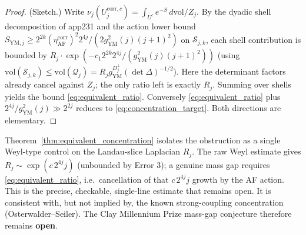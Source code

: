 \begin{proof}
(Sketch.) Write $\nu_{j}(U^{\mathrm{corr},c}_{j})=\int_{U^{c}}e^{-S}\,d\mathrm{vol}/Z_{j}$.
By the dyadic shell decomposition of app231 and the action lower bound
$S_{\mathrm{YM},j}\ge 2^{2k}(\eta_{\mathrm{AF}}^{\mathrm{corr}})^{2}2^{4j}/(2g_{\mathrm{YM}}^{2}(j)(j+1)^{2})$
on $\mathcal{S}_{j,k}$, each shell contribution is bounded by
$R_{j}\cdot\exp(-c_{1}2^{2k}2^{4j}/(g_{\mathrm{YM}}^{2}(j)(j+1)^{2}))$
(using $\mathrm{vol}(\mathcal{S}_{j,k})\le\mathrm{vol}(\mathcal{Q}_{j})=R_{j}g_{\mathrm{YM}}^{D_{j}^{\perp}}(\det\Delta)^{-1/2}$).
Here the determinant factors already cancel against $Z_{j}$; the only
ratio left is exactly $R_{j}$. Summing over shells yields the bound
\eqref{eq:equivalent_ratio}. Conversely \eqref{eq:equivalent_ratio} plus
$2^{4j}/g_{\mathrm{YM}}^{2}(j)\gg 2^{2j}$ reduces to
\eqref{eq:concentration_target}. Both directions are elementary.
\end{proof}

\begin{remark}
\label{rem:honset_target}
Theorem~\ref{thm:equivalent_concentration} isolates the obstruction as a
single Weyl-type control on the Landau-slice Laplacian $R_{j}$. The raw
Weyl estimate gives $R_{j}\sim\exp(c\,2^{4j}j)$ (unbounded by
Error 3); a genuine mass gap requires \eqref{eq:equivalent_ratio}, i.e.\
cancellation of that $c\,2^{4j}j$ growth by the AF action. This is the
precise, checkable, single-line estimate that remains open. It is
consistent with, but not implied by, the known strong-coupling
concentration (Osterwalder--Seiler). The Clay Millennium Prize mass-gap
conjecture therefore remains \textbf{open}.
\end{remark}

\endinput
